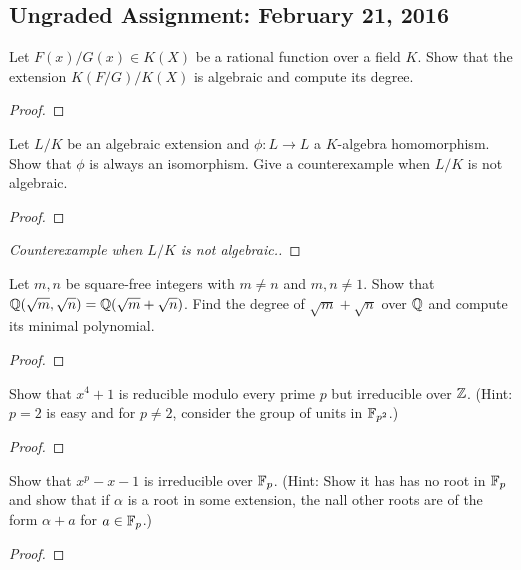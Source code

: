 \subsection[Assignment 1]{Ungraded Assignment: February 21, 2016}

\begin{que} %
Let $F(x)/G(x) \in K(X)$ be a rational function over a field $K$. Show that the extension $K(F/G)/K(X)$ is algebraic and compute its degree.
\end{que}
\begin{proof}

\end{proof}

\begin{que} %
Let $L/K$ be an algebraic extension and $\phi: L \to L$ a $K$-algebra homomorphism. Show that $\phi$ is always an isomorphism. Give a counterexample when $L/K$ is not algebraic.
\end{que}
\begin{proof}

\end{proof}
\begin{proof}[Counterexample when $L/K$ is not algebraic.]

\end{proof}

\begin{que} %
Let $m, n$ be square-free integers with $m \neq n$ and $m,n \neq 1$. Show that $\mathbb{Q}(\sqrt{m}, \sqrt{n}) = \mathbb{Q}(\sqrt{m} + \sqrt{n})$. Find the degree of $\sqrt{m} + \sqrt{n}$ over $\mathbb{Q}$ and compute its minimal polynomial.
\end{que}
\begin{proof}

\end{proof}

\begin{que} %
Show that $x^4 + 1$ is reducible modulo every prime $p$ but irreducible over $\mathbb{Z}$. (Hint: $p = 2$ is easy and for $p \neq 2$, consider the group of units in $\mathbb{F}_{p^2}$.)
\end{que}
\begin{proof}

\end{proof}

\begin{que} %
Show that $x^p - x - 1$ is irreducible over $\mathbb{F}_p$. (Hint: Show it has has no root in $\mathbb{F}_p$ and show that if $\alpha$ is a root in some extension, the nall other roots are of the form $\alpha + a$ for $a \in \mathbb{F}_p$.)
\end{que}
\begin{proof}

\end{proof}

